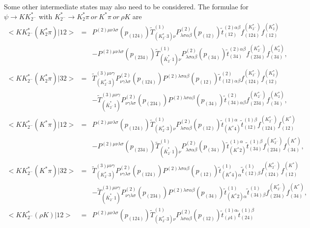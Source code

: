 Some other intermediate states may also need to be considered. The
formulae for $\psi\to KK^*_{2^-}$ with $K^*_{2^-}\to K^*_2
\pi~or~K^*\pi~or~\rho K$ are
\begin{eqnarray}
<KK^*_{2^-}(K^*_2\pi)|12> \!&=&\!
P^{(2)\mu\nu\lambda\sigma}(p_{(124)}) \tilde
T^{(1)}_{(K^*_{2^-}3)\nu}
P^{(2)}_{\lambda\sigma\alpha\beta}(p_{(12)}) \tilde
t^{(2)\alpha\beta}_{(12)}f^{(K^*_{2^-})}_{(124)}f^{(K^*_2)}_{(12)}
\nonumber\\ & &  - P^{(2)\mu\nu\lambda\sigma}(p_{(234)}) \tilde
T^{(1)}_{(\bar K^*_{2^-}1)\nu}
P^{(2)}_{\lambda\sigma\alpha\beta}(p_{(34)}) \tilde
t^{(2)\alpha\beta}_{(34)}f^{(K^*_{2^-})}_{(234)}f^{(K^*_2)}_{(34)}, \\
<KK^*_{2^-}(K^*_2\pi)|32> \!&=&\! \tilde
T^{(3)\mu\nu\gamma}_{(K^*_{2^-}3)}
P^{(2)}_{\nu\gamma\lambda\sigma}(p_{(124)})
P^{(2)\lambda\sigma\alpha\beta}(p_{(12)}) \tilde
t^{(2)}_{(12)\alpha\beta}f^{(K^*_{2^-})}_{(124)}f^{(K^*_2)}_{(12)}
\nonumber\\ & &  - \tilde T^{(3)\mu\nu\gamma}_{(\bar K^*_{2^-}1)}
P^{(2)}_{\nu\gamma\lambda\sigma}(p_{(234)})
P^{(2)\lambda\sigma\alpha\beta}(p_{(34)}) \tilde
t^{(2)}_{(34)\alpha\beta}f^{(K^*_{2^-})}_{(234)}f^{(K^*_2)}_{(34)},\\
<KK^*_{2^-}(K^*\pi)|12> \!&=&\!
P^{(2)\mu\nu\lambda\sigma}(p_{(124)}) \tilde
T^{(1)}_{(K^*_{2^-}3)\nu}
P^{(2)}_{\lambda\sigma\alpha\beta}(p_{(12)}) \tilde
t^{(1)\alpha}_{(K^*4)} \tilde t^{(1)\beta}_{(12)}
f^{(K^*_{2^-})}_{(124)}f^{(K^*)}_{(12)} \nonumber\\ & &  -
P^{(2)\mu\nu\lambda\sigma}(p_{(234)}) \tilde T^{(1)}_{(\bar
K^*_{2^-}1)\nu} P^{(2)}_{\lambda\sigma\alpha\beta}(p_{(34)})
\tilde t^{(1)\alpha}_{(K^*2)} \tilde t^{(1)\beta}_{(34)}
f^{(K^*_{2^-})}_{(234)}f^{(K^*)}_{(34)}, \quad \\
<KK^*_{2^-}(K^*\pi)|32> \!&=&\! \tilde
T^{(3)\mu\nu\gamma}_{(K^*_{2^-}3)}
P^{(2)}_{\nu\gamma\lambda\sigma}(p_{(124)})
P^{(2)\lambda\sigma\alpha\beta}(p_{(12)}) \tilde
t^{(1)}_{(K^*4)\alpha} \tilde t^{(1)}_{(12)\beta}
f^{(K^*_{2^-})}_{(124)}f^{(K^*)}_{(12)} \nonumber\\ & &  - \tilde
T^{(3)\mu\nu\gamma}_{(\bar K^*_{2^-}1)}
P^{(2)}_{\nu\gamma\lambda\sigma}(p_{(234)})
P^{(2)\lambda\sigma\alpha\beta}(p_{(34)}) \tilde
t^{(1)}_{(K^*2)\alpha} \tilde t^{(1)}_{(34)\beta}
f^{(K^*_{2^-})}_{(234)}f^{(K^*)}_{(34)},\\
<KK^*_{2^-}(\rho K)|12> \!&=&\!
P^{(2)\mu\nu\lambda\sigma}(p_{(124)}) \tilde
T^{(1)}_{(K^*_{2^-}3)\nu}
P^{(2)}_{\lambda\sigma\alpha\beta}(p_{(12)}) \tilde
t^{(1)\alpha}_{(\rho 1)} \tilde t^{(1)\beta}_{(24)}

\end{eqnarray}
